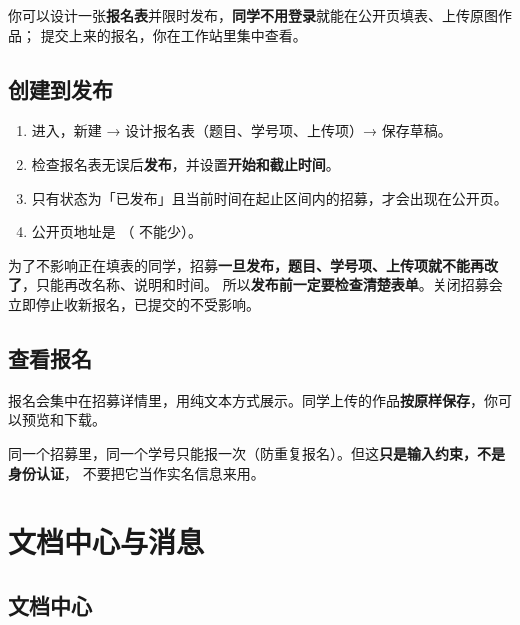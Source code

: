 \documentclass[cn,11pt,green]{elegantbook}
\begin{document}
你可以设计一张\textbf{报名表}并限时发布，\textbf{同学不用登录}就能在公开页填表、上传原图作品；
提交上来的报名，你在工作站里集中查看。

\section{创建到发布}

\begin{stepbox}[发布一次招募]
  \begin{enumerate}
    \item 进入，新建 → 设计报名表（题目、学号项、上传项）→ 保存草稿。
    \item 检查报名表无误后\textbf{发布}，并设置\textbf{开始和截止时间}。
    \item 只有状态为「已发布」且当前时间在起止区间内的招募，才会出现在公开页。
    \item 公开页地址是 （\code{\#} 不能少）。
  \end{enumerate}
\end{stepbox}

\begin{warnbox}[发布后表单结构会被冻结]
  为了不影响正在填表的同学，招募\textbf{一旦发布，题目、学号项、上传项就不能再改了}，只能再改名称、说明和时间。
  所以\textbf{发布前一定要检查清楚表单}。关闭招募会立即停止收新报名，已提交的不受影响。
\end{warnbox}

\section{查看报名}

报名会集中在招募详情里，用纯文本方式展示。同学上传的作品\textbf{按原样保存}，你可以预览和下载。

\begin{notebox}[学号不是实名认证]
  同一个招募里，同一个学号只能报一次（防重复报名）。但这\textbf{只是输入约束，不是身份认证}，
  不要把它当作实名信息来用。
\end{notebox}

\chapter{文档中心与消息}

\section{文档中心}
\end{document}
